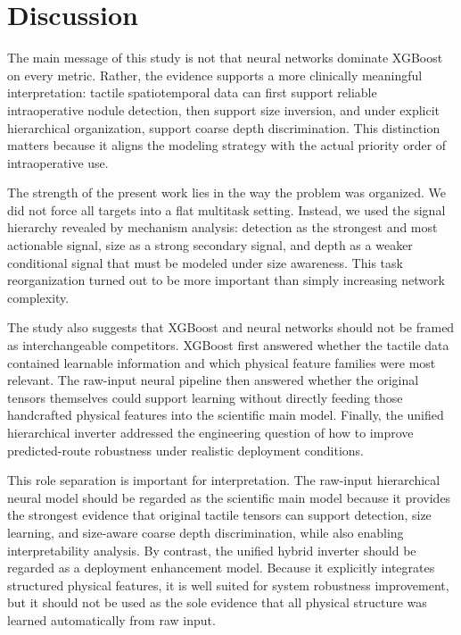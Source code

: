 \section{Discussion}

The main message of this study is not that neural networks dominate XGBoost on every metric. Rather, the evidence supports a more clinically meaningful interpretation: tactile spatiotemporal data can first support reliable intraoperative nodule detection, then support size inversion, and under explicit hierarchical organization, support coarse depth discrimination. This distinction matters because it aligns the modeling strategy with the actual priority order of intraoperative use.

The strength of the present work lies in the way the problem was organized. We did not force all targets into a flat multitask setting. Instead, we used the signal hierarchy revealed by mechanism analysis: detection as the strongest and most actionable signal, size as a strong secondary signal, and depth as a weaker conditional signal that must be modeled under size awareness. This task reorganization turned out to be more important than simply increasing network complexity.

The study also suggests that XGBoost and neural networks should not be framed as interchangeable competitors. XGBoost first answered whether the tactile data contained learnable information and which physical feature families were most relevant. The raw-input neural pipeline then answered whether the original tensors themselves could support learning without directly feeding those handcrafted physical features into the scientific main model. Finally, the unified hierarchical inverter addressed the engineering question of how to improve predicted-route robustness under realistic deployment conditions.

This role separation is important for interpretation. The raw-input hierarchical neural model should be regarded as the scientific main model because it provides the strongest evidence that original tactile tensors can support detection, size learning, and size-aware coarse depth discrimination, while also enabling interpretability analysis. By contrast, the unified hybrid inverter should be regarded as a deployment enhancement model. Because it explicitly integrates structured physical features, it is well suited for system robustness improvement, but it should not be used as the sole evidence that all physical structure was learned automatically from raw input.

